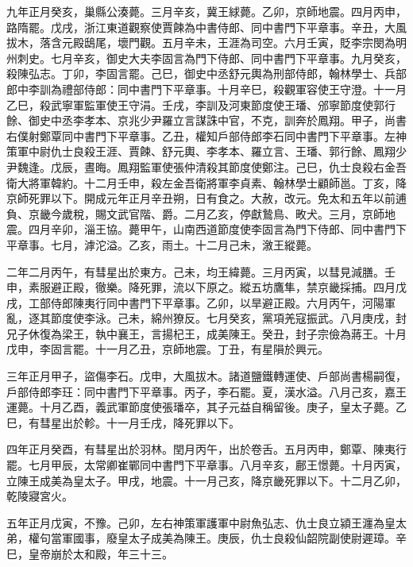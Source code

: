 \begin{pinyinscope}
 九年正月癸亥，巢縣公湊薨。三月辛亥，冀王絿薨。乙卯，京師地震。四月丙申，路隋罷。戊戌，浙江東道觀察使賈餗為中書侍郎、同中書門下平章事。辛丑，大風拔木，落含元殿鴟尾，壞門觀。五月辛未，王涯為司空。六月壬寅，貶李宗閔為明州刺史。七月辛亥，御史大夫李固言為門下侍郎、同中書門下平章事。九月癸亥，殺陳弘志。丁卯，李固言罷。己巳，御史中丞舒元輿為刑部侍郎，翰林學士、兵部郎中李訓為禮部侍郎：同中書門下平章事。十月辛巳，殺觀軍容使王守澄。十一月乙巳，殺武寧軍監軍使王守涓。壬戌，李訓及河東節度使王璠、邠寧節度使郭行餘、御史中丞李孝本、京兆少尹羅立言謀誅中官，不克，訓奔於鳳翔。甲子，尚書右僕射鄭覃同中書門下平章事。乙丑，權知戶部侍郎李石同中書門下平章事。左神策軍中尉仇士良殺王涯、賈餗、舒元輿、李孝本、羅立言、王璠、郭行餘、鳳翔少尹魏逢。戊辰，晝晦。鳳翔監軍使張仲清殺其節度使鄭注。己巳，仇士良殺右金吾衛大將軍韓約。十二月壬申，殺左金吾衛將軍李貞素、翰林學士顧師邕。丁亥，降京師死罪以下。開成元年正月辛丑朔，日有食之。大赦，改元。免太和五年以前逋負、京畿今歲稅，賜文武官階、爵。二月乙亥，停獻鷙鳥、畋犬。三月，京師地震。四月辛卯，淄王協。薨甲午，山南西道節度使李固言為門下侍郎、同中書門下平章事。七月，滹沱溢。乙亥，雨土。十二月己未，漵王縱薨。



 二年二月丙午，有彗星出於東方。己未，均王緯薨。三月丙寅，以彗見減膳。壬申，素服避正殿，徹樂。降死罪，流以下原之。縱五坊鷹隼，禁京畿採捕。四月戊戌，工部侍郎陳夷行同中書門下平章事。乙卯，以旱避正殿。六月丙午，河陽軍亂，逐其節度使李泳。己未，綿州獠反。七月癸亥，黨項羌寇振武。八月庚戌，封兄子休復為梁王，執中襄王，言揚杞王，成美陳王。癸丑，封子宗儉為蔣王。十月戊申，李固言罷。十一月乙丑，京師地震。丁丑，有星隕於興元。



 三年正月甲子，盜傷李石。戊申，大風拔木。諸道鹽鐵轉運使、戶部尚書楊嗣復，戶部侍郎李玨：同中書門下平章事。丙子，李石罷。夏，漢水溢。八月己亥，嘉王運薨。十月乙酉，義武軍節度使張璠卒，其子元益自稱留後。庚子，皇太子薨。乙巳，有彗星出於軫。十一月壬戌，降死罪以下。



 四年正月癸酉，有彗星出於羽林。閏月丙午，出於卷舌。五月丙申，鄭覃、陳夷行罷。七月甲辰，太常卿崔鄲同中書門下平章事。八月辛亥，鄜王憬薨。十月丙寅，立陳王成美為皇太子。甲戌，地震。十一月己亥，降京畿死罪以下。十二月乙卯，乾陵寢宮火。



 五年正月戊寅，不豫。己卯，左右神策軍護軍中尉魚弘志、仇士良立潁王瀍為皇太弟，權句當軍國事，廢皇太子成美為陳王。庚辰，仇士良殺仙韶院副使尉遲璋。辛巳，皇帝崩於太和殿，年三十三。




\end{pinyinscope}
